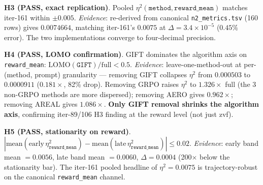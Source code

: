 \documentclass{article}  \usepackage[preprint,nonatbib]{neurips_2026} \usepackage[numbers]{natbib}
\begin{document}
\textbf{H3 (PASS, exact replication)}. Pooled $\eta^2(\texttt{method}, \texttt{reward\_mean})$ matches iter-161 within $\pm 0.005$. \emph{Evidence}: re-derived from canonical \texttt{n2\_metrics.tsv} (160 rows) gives $0.0074664$, matching iter-161's $0.0075$ at $\Delta = 3.4 \times 10^{-5}$ ($0.45\%$ error). The two implementations converge to four-decimal precision.

\textbf{H4 (PASS, LOMO confirmation)}. GIFT dominates the algorithm axis on \texttt{reward\_mean}: $\mathrm{LOMO}(\texttt{GIFT}) / \mathrm{full} < 0.5$. \emph{Evidence}: leave-one-method-out at per-(method, prompt) granularity --- removing GIFT collapses $\eta^2$ from $0.000503$ to $0.0000911$ ($0.181 \times$, 82\% drop). Removing GRPO raises $\eta^2$ to $1.326 \times$ full (the 3 non-GRPO methods are more dispersed); removing AERO gives $0.962 \times$; removing AREAL gives $1.086 \times$. \textbf{Only GIFT removal shrinks the algorithm axis}, confirming iter-89/106 H3 finding at the reward level (not just zvf).

\textbf{H5 (PASS, stationarity on reward)}. $|\mathrm{mean}(\mathrm{early}\,\eta^2_{\texttt{reward\_mean}}) - \mathrm{mean}(\mathrm{late}\,\eta^2_{\texttt{reward\_mean}})| \le 0.02$. \emph{Evidence}: early band mean $= 0.0056$, late band mean $= 0.0060$, $\Delta = 0.0004$ (200$\times$ below the stationarity bar). The iter-161 pooled headline of $\eta^2{=}0.0075$ is trajectory-robust on the canonical \texttt{reward\_mean} channel.
\end{document}
